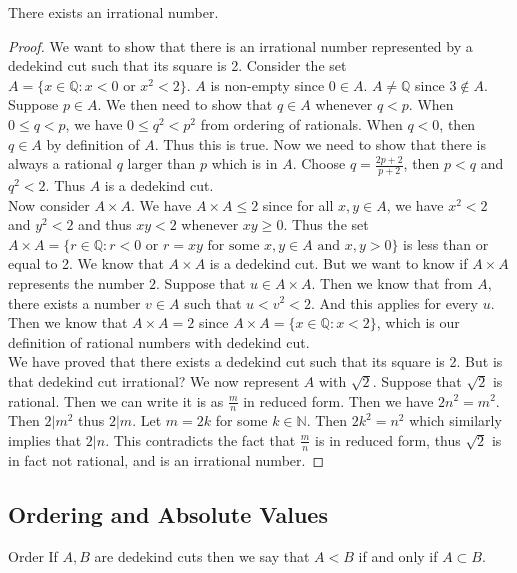 \documentclass[a4paper]{article}
\begin{document}
\begin{thm}{}{} There exists an irrational number. 
\begin{proof} We want to show that there is an irrational number represented by a dedekind cut such that its square is 2. Consider the set $A=\{x\in\mathbb{Q}:x<0\text{ or }x^2<2\}$. $A$ is non-empty since $0\in A$. $A\neq\mathbb{Q}$ since $3\notin A$. Suppose $p\in A$. We then need to show that $q\in A$ whenever $q<p$. When $0\leq q<p$, we have $0\leq q^2<p^2$ from ordering of rationals. When $q<0$, then $q\in A$ by definition of $A$. Thus this is true. Now we need to show that there is always a rational $q$ larger than $p$ which is in $A$. Choose $q=\frac{2p+2}{p+2}$, then $p<q$ and $q^2<2$. Thus $A$ is a dedekind cut. \\
Now consider $A\times A$. We have $A\times A\leq 2$ since for all $x,y\in A$, we have $x^2<2$ and $y^2<2$ and thus $xy<2$ whenever $xy\geq 0$. Thus the set $A\times A=\{r\in\mathbb{Q}:r<0\text{ or }r=xy\text{ for some }x,y\in A\text{ and }x,y>0\}$ is less than or equal to 2. We know that $A\times A$ is a dedekind cut. But we want to know if $A\times A$ represents the number $2$. Suppose that $u\in A\times A$. Then we know that from $A$, there exists a number $v\in A$ such that $u<v^2<2$. And this applies for every $u$. Then we know that $A\times A=2$ since $A\times A=\{x\in\mathbb{Q}:x<2\}$, which is our definition of rational numbers with dedekind cut. \\
We have proved that there exists a dedekind cut such that its square is 2. But is that dedekind cut irrational? We now represent $A$ with $\sqrt2$. Suppose that $\sqrt2$ is rational. Then we can write it is as $\frac{m}{n}$ in reduced form. Then we have $2n^2=m^2$. Then $2|m^2$ thus $2|m$. Let $m=2k$ for some $k\in\mathbb{N}$. Then $2k^2=n^2$ which similarly implies that $2|n$. This contradicts the fact that $\frac{m}{n}$ is in reduced form, thus $\sqrt{2}$ is in fact not rational, and is an irrational number. 
\end{proof}
\end{thm}

\subsection{Ordering and Absolute Values}
\begin{defn}{Order}{} If $A,B$ are dedekind cuts then we say that $A<B$ if and only if $A\subset B$. 
\end{defn}
\end{document}
